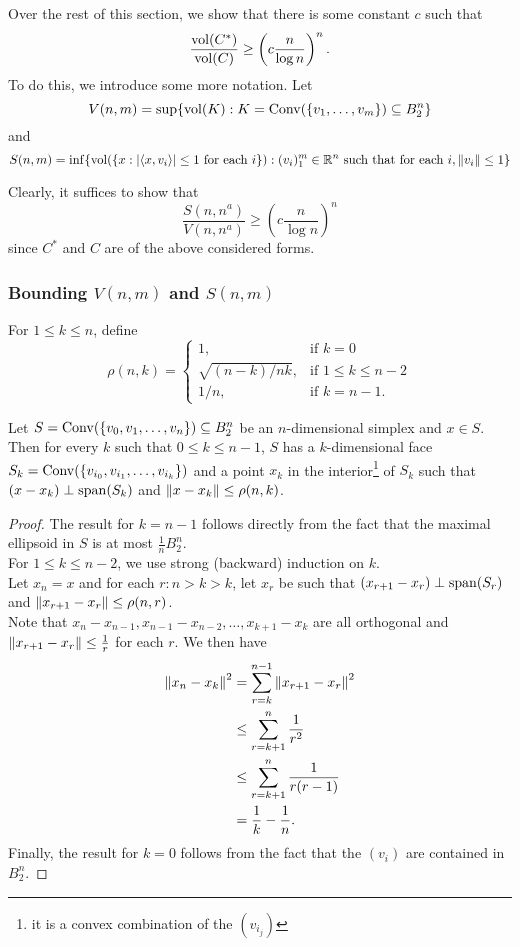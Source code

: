Over the rest of this section, we show that there is some constant $c$ such that
\[ \frac{\operatorname{vol}(C^*)}{\operatorname{vol}(C)} \geq \left(c \frac{n}{\log n}\right)^n. \]
To do this, we introduce some more notation. Let
\[ V(n,m) = \sup\{\operatorname{vol}(K):K=\operatorname{Conv}(\{v_1,\ldots,v_m\})\subseteq B_2^n\} \]
and
\[ S(n,m) = \inf\{\operatorname{vol}(\{x:|\langle x,v_i\rangle| \leq 1\text{ for each $i$}\}) : (v_i)_1^m\in\mathbb{R}^n\text{ such that for each }i, \left\lVert v_i\right\rVert\leq 1\} \]

Clearly, it suffices to show that
\begin{equation}
\label{eqn: barany furedy}
    \frac{S(n,n^a)}{V(n,n^a)} \geq \left(c \frac{n}{\log n}\right)^n
\end{equation}
since $C^*$ and $C$ are of the above considered forms.\\

\subsubsection{Bounding \texorpdfstring{$V(n,m)$}{} and \texorpdfstring{$S(n,m)$}{}}

For $1\leq k\leq n$, define
\[
\rho(n,k) = 
\begin{cases}
1, & \text{if }k=0 \\
\sqrt{(n-k)/nk}, & \text{if }1\leq k\leq n-2 \\
1/n, & \text{if }k=n-1.
\end{cases}
\]

\begin{lemma}
\label{rho span bound}
Let $S=\operatorname{Conv}(\{v_0,v_1,\ldots,v_n\})\subseteq B_2^n$ be an $n$-dimensional simplex and $x\in S$. Then for every $k$ such that $0\leq k\leq n-1$, $S$ has a $k$-dimensional face $S_k = \operatorname{Conv}(\{v_{i_0},v_{i_1},\ldots,v_{i_k}\})$ and a point $x_k$ in the interior\footnote{it is a convex combination of the $(v_{i_j})$} of $S_k$ such that $(x-x_k) \perp \operatorname{span}(S_k)$ and $\left\lVert x-x_k\right\rVert\leq \rho(n,k)$.
\end{lemma}

\begin{proof}
The result for $k=n-1$ follows directly from the fact that the maximal ellipsoid in $S$ is at most $\frac{1}{n}B_2^n$.\\
For $1\leq k\leq n-2$, we use strong (backward) induction on $k$.\\
Let $x_n=x$ and for each $r:n>k>k$, let $x_r$ be such that $(x_{r+1}-x_r)\perp \operatorname{span}(S_r)$ and $\left\lVert x_{r+1}-x_r\right\rVert \leq \rho(n,r)$.\\
Note that $x_n - x_{n-1}, x_{n-1}-x_{n-2},\ldots,x_{k+1}-x_{k}$ are all orthogonal and $\left\lVert x_{r+1} - x_r\right\rVert\leq\frac{1}{r}$ for each $r$. We then have
\begin{align*}
    \left\lVert x_n - x_k\right\rVert^2 &= \sum_{r=k}^{n-1} \left\lVert x_{r+1}-x_r\right\rVert^2 \\
    &\leq \sum_{r=k+1}^{n} \frac{1}{r^2} \\
    &\leq \sum_{r=k+1}^{n} \frac{1}{r(r-1)} \\
    &= \frac{1}{k} - \frac{1}{n}.
\end{align*}
Finally, the result for $k=0$ follows from the fact that the $(v_i)$ are contained in $B_2^n$.
\end{proof}

